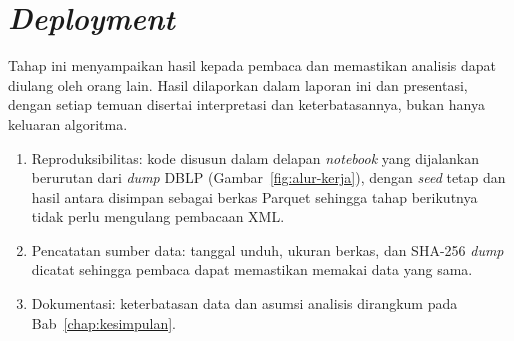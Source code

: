 \section{\textit{Deployment}}
Tahap ini menyampaikan hasil kepada pembaca dan memastikan analisis dapat diulang oleh orang lain. Hasil dilaporkan dalam laporan ini dan presentasi, dengan setiap temuan disertai interpretasi dan keterbatasannya, bukan hanya keluaran algoritma.
\begin{enumerate}
\item Reproduksibilitas: kode disusun dalam delapan \textit{notebook} yang dijalankan berurutan dari \textit{dump} DBLP (Gambar~\ref{fig:alur-kerja}), dengan \textit{seed} tetap dan hasil antara disimpan sebagai berkas Parquet sehingga tahap berikutnya tidak perlu mengulang pembacaan XML.
\item Pencatatan sumber data: tanggal unduh, ukuran berkas, dan SHA-256 \textit{dump} dicatat sehingga pembaca dapat memastikan memakai data yang sama.
\item Dokumentasi: keterbatasan data dan asumsi analisis dirangkum pada Bab~\ref{chap:kesimpulan}.
\end{enumerate}
